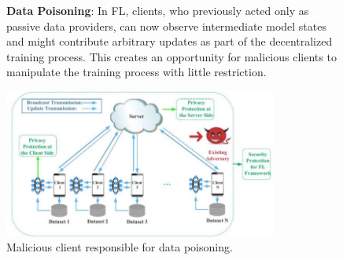 \documentclass[conference]{IEEEtran}
\begin{document}
\begin{figure}
\vspace{\baselineskip}


\textbf{Data Poisoning}: In FL, clients, who previously acted only as passive data providers, can now observe intermediate model states and might contribute arbitrary updates as part of the decentralized training process. This creates an opportunity for malicious
clients to manipulate the training process with little restriction.

\vspace{\baselineskip}

\includegraphics[width=90mm,scale=0.7]{14.jpeg}
\caption{Malicious client responsible for data poisoning.}
\end{figure}

\vspace{\baselineskip}
\end{document}
